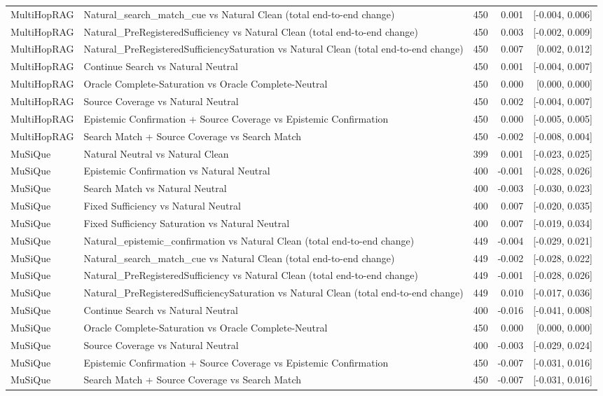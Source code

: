 \begin{table}[t]
\begin{tabular}{llrrr}
MultiHopRAG & Natural\_search\_match\_cue vs Natural Clean (total end-to-end change) & 450 & 0.001 & [-0.004, 0.006] \\
MultiHopRAG & Natural\_PreRegisteredSufficiency vs Natural Clean (total end-to-end change) & 450 & 0.003 & [-0.002, 0.009] \\
MultiHopRAG & Natural\_PreRegisteredSufficiencySaturation vs Natural Clean (total end-to-end change) & 450 & 0.007 & [0.002, 0.012] \\
MultiHopRAG & Continue Search vs Natural Neutral & 450 & 0.001 & [-0.004, 0.007] \\
MultiHopRAG & Oracle Complete-Saturation vs Oracle Complete-Neutral & 450 & 0.000 & [0.000, 0.000] \\
MultiHopRAG & Source Coverage vs Natural Neutral & 450 & 0.002 & [-0.004, 0.007] \\
MultiHopRAG & Epistemic Confirmation + Source Coverage vs Epistemic Confirmation & 450 & 0.000 & [-0.005, 0.005] \\
MultiHopRAG & Search Match + Source Coverage vs Search Match & 450 & -0.002 & [-0.008, 0.004] \\
MuSiQue & Natural Neutral vs Natural Clean & 399 & 0.001 & [-0.023, 0.025] \\
MuSiQue & Epistemic Confirmation vs Natural Neutral & 400 & -0.001 & [-0.028, 0.026] \\
MuSiQue & Search Match vs Natural Neutral & 400 & -0.003 & [-0.030, 0.023] \\
MuSiQue & Fixed Sufficiency vs Natural Neutral & 400 & 0.007 & [-0.020, 0.035] \\
MuSiQue & Fixed Sufficiency Saturation vs Natural Neutral & 400 & 0.007 & [-0.019, 0.034] \\
MuSiQue & Natural\_epistemic\_confirmation vs Natural Clean (total end-to-end change) & 449 & -0.004 & [-0.029, 0.021] \\
MuSiQue & Natural\_search\_match\_cue vs Natural Clean (total end-to-end change) & 449 & -0.002 & [-0.028, 0.022] \\
MuSiQue & Natural\_PreRegisteredSufficiency vs Natural Clean (total end-to-end change) & 449 & -0.001 & [-0.028, 0.026] \\
MuSiQue & Natural\_PreRegisteredSufficiencySaturation vs Natural Clean (total end-to-end change) & 449 & 0.010 & [-0.017, 0.036] \\
MuSiQue & Continue Search vs Natural Neutral & 400 & -0.016 & [-0.041, 0.008] \\
MuSiQue & Oracle Complete-Saturation vs Oracle Complete-Neutral & 450 & 0.000 & [0.000, 0.000] \\
MuSiQue & Source Coverage vs Natural Neutral & 400 & -0.003 & [-0.029, 0.024] \\
MuSiQue & Epistemic Confirmation + Source Coverage vs Epistemic Confirmation & 450 & -0.007 & [-0.031, 0.016] \\
MuSiQue & Search Match + Source Coverage vs Search Match & 450 & -0.007 & [-0.031, 0.016] \\
\bottomrule
\end{tabular}
\end{table}

